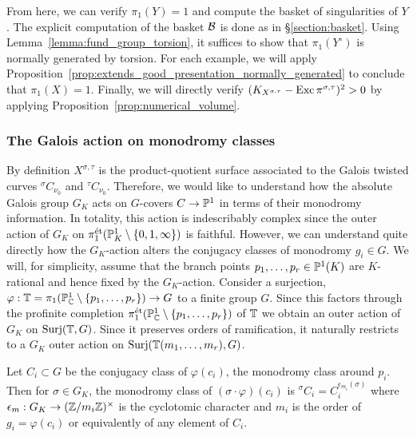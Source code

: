 \documentclass[main.tex]{subfiles}
\begin{document}
\par 
From here, we can verify $\pi_1(Y) = 1$ and compute the basket of singularities of $Y$. The explicit computation of the basket $\cB$ is done as in \S\ref{section:basket}. 
Using Lemma~\ref{lemma:fund_group_torsion}, it suffices to show that $\pi_1(Y^{\circ})$ is normally generated by torsion. For each example, we will apply Proposition~\ref{prop:extends_good_presentation_normally_generated} to conclude that $\pi_1(X) = 1$. Finally, we will directly verify $(K_{X^{\sigma, \tau}} - \Exc{\pi^{\sigma, \tau}})^2 > 0$ by applying Proposition~\ref{prop:numerical_volume}.

\subsubsection{The Galois action on monodromy classes} \label{section:galois_action}

By definition $X^{\sigma, \tau}$ is the product-quotient surface associated to the Galois twisted curves ${}^{\sigma} C_{\nu_0}$ and ${}^{\tau} C_{\nu_0}$. Therefore, we would like to understand how the absolute Galois group $G_{K}$ acts on $G$-covers $C \to \P^1$ in terms of their monodromy information. In totality, this action is indescribably complex since the outer action of $G_{K}$ on $\pi_1^{\et}(\P^1_{K} \sm \{ 0,1,\infty \})$ is faithful. However, we can understand quite directly how the $G_K$-action alters the conjugacy classes of monodromy $g_i \in G$. We will, for simplicity, assume that the branch points $p_1, \dots, p_r \in \P^1(K)$ are $K$-rational and hence fixed by the $G_K$-action. Consider a surjection, $\varphi : \TT = \pi_1(\P^1_{\CC} \sm \{ p_1, \dots, p_r \}) \to G$ to a finite group $G$. Since this factors through the profinite completion $\pi_1^{\et}(\P^1_{\CC} \sm \{ p_1, \dots, p_r \})$ of $\TT$  we obtain an outer action of $G_K$ on $\mathrm{Surj}(\TT, G)$. Since it preserves orders of ramification, it naturally restricts to a $G_K$ outer action on $\mathrm{Surj}(\TT(m_1, \dots, m_r), G)$.  

\begin{thm} \cite[Theorem~2.6]{malle_matzat:inverse_galois_theory}
Let $C_i \subset G$ be the conjugacy class of $\varphi(c_i)$, the monodromy class around $p_i$. Then for $\sigma \in G_K$, the monodromy class of $(\sigma \cdot \varphi)(c_i)$ is ${}^{\sigma} C_i = C_i^{\epsilon_{m_i}(\sigma)}$ where $\epsilon_m : G_K \to (\Z / m_i \Z)^{\times}$ is the cyclotomic character and $m_i$ is the order of $g_i = \varphi(c_i)$ or equivalently of any element of $C_i$. 
\end{thm}
\end{document}
